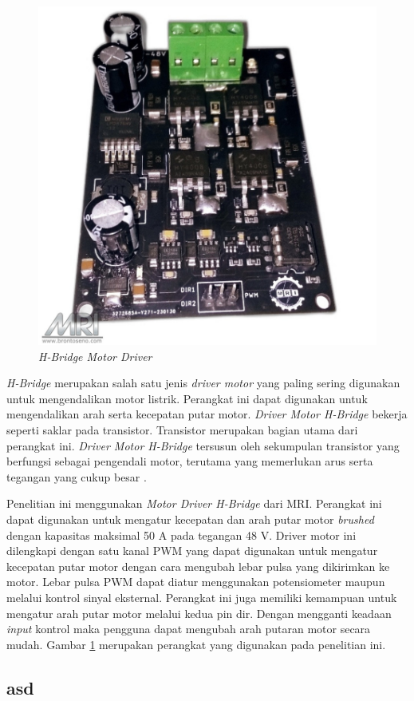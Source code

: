 \begin{figure} [ht]
    \centering
        \includegraphics[scale=0.2]{gambar/MotorDriver.png}
        \caption{\emph{H-Bridge Motor Driver}}
        \label{fig:DriverMotor}
\end{figure}

\emph{H-Bridge} merupakan salah satu jenis \emph{driver motor} yang paling sering digunakan untuk mengendalikan motor listrik. Perangkat ini dapat digunakan untuk mengendalikan arah serta kecepatan putar motor. \emph{Driver Motor H-Bridge} bekerja seperti saklar pada transistor. Transistor merupakan bagian utama dari perangkat ini. \emph{Driver Motor H-Bridge} tersusun oleh sekumpulan transistor yang berfungsi sebagai pengendali motor, terutama yang memerlukan arus serta tegangan yang cukup besar \parencite{Muhammad_2018}.

Penelitian ini menggunakan \emph{Motor Driver H-Bridge} dari MRI. Perangkat ini dapat digunakan untuk mengatur kecepatan dan arah putar motor \emph{brushed} dengan kapasitas maksimal 50 A pada tegangan 48 V. Driver motor ini dilengkapi dengan satu kanal PWM yang dapat digunakan untuk mengatur kecepatan putar motor dengan cara mengubah lebar pulsa yang dikirimkan ke motor. Lebar pulsa PWM dapat diatur menggunakan potensiometer maupun melalui kontrol sinyal eksternal. Perangkat ini juga memiliki kemampuan untuk mengatur arah putar motor melalui kedua pin dir. Dengan mengganti keadaan \emph{input} kontrol maka pengguna dapat mengubah arah putaran motor secara mudah. Gambar \ref*{fig:DriverMotor} merupakan perangkat yang digunakan pada penelitian ini.



\subsection{asd}